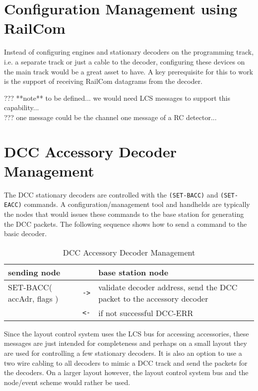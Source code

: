 \section{Configuration Management using RailCom}

Instead of configuring engines and stationary decoders on the programming track, i.e. a separate track or just a cable to the decoder, configuring  these devices on the main track would be a great asset to have. A key prerequisite for this to work is the support of receiving RailCom datagrams from the decoder.

??? **note** to be defined... we would need LCS messages to support this capability... \\
??? one message could be the channel one message of a RC detector...

\section{DCC Accessory Decoder Management}

The DCC stationary decoders are controlled with the \texttt{(SET-BACC)} and \texttt{(SET-EACC)} commands. A configuration/management tool and handhelds are typically the nodes that would issues these commands to the base station for generating the DCC packets. The following sequence shows how to send a command to the basic decoder.

\begin{table}[ht!]
    \begin{center}
        \caption{DCC Accessory Decoder Management}
        \begin{tabular}{|p{}| c |p{}|}
            \toprule
            \textbf{sending node} & & \textbf{ base station node} \\
            \midrule
            SET-BACC( accAdr, flags ) & \texttt{->} & validate decoder address, send the DCC packet to the accessory decoder \\
            & \texttt{<-} & if not successful DCC-ERR \\
            \bottomrule
        \end{tabular}
    \end{center}
\end{table}

Since the layout control system uses the LCS bus for accessing accessories, these messages are just intended for completeness and perhaps on a small layout they are used for controlling a few stationary decoders. It is also an option to use a two wire cabling to all decoders to mimic a DCC track and send the packets for the decoders. On a larger layout however, the layout control system bus and the node/event scheme would rather be used.

